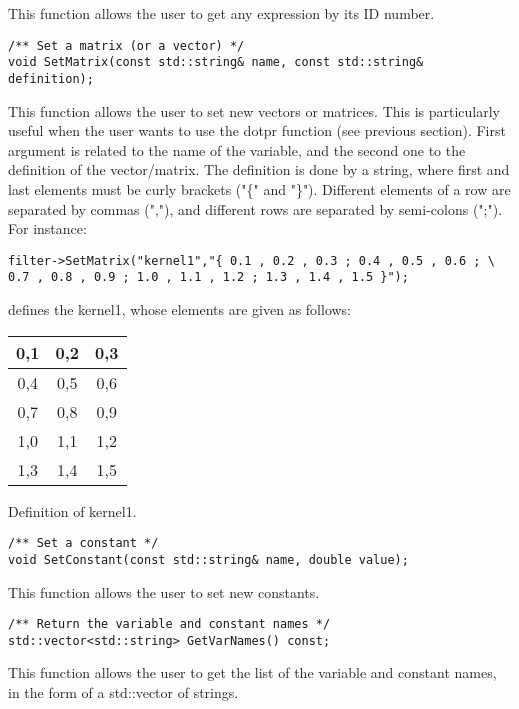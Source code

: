 This function allows the user to get any expression by its ID number.

\begin{verbatim}
/** Set a matrix (or a vector) */
void SetMatrix(const std::string& name, const std::string& definition);
\end{verbatim}

This function allows the user to set new vectors or matrices. This is 
particularly useful when the user wants to use the dotpr function 
(see previous section). First argument is related to the name of the 
variable, and the second one to the definition of the vector/matrix. 
The definition is done by a string, where first and last elements must 
be curly brackets ("\{" and "\}"). Different elements of a row are 
separated by commas (","), and different rows are separated by 
semi-colons (";"). For instance:

\begin{verbatim}
filter->SetMatrix("kernel1","{ 0.1 , 0.2 , 0.3 ; 0.4 , 0.5 , 0.6 ; \
0.7 , 0.8 , 0.9 ; 1.0 , 1.1 , 1.2 ; 1.3 , 1.4 , 1.5 }");
\end{verbatim}

defines the kernel1, whose elements are given as follows:

\begin{center} 
\begin{tabular}{|c|c|c|}
\hline
0,1	& 0,2	& 0,3 \\
\hline
0,4 &	0,5	& 0,6 \\
\hline
0,7 &	0,8	& 0,9 \\
\hline
1,0	& 1,1	& 1,2 \\
\hline
1,3	& 1,4	& 1,5 \\
\hline
\end{tabular}
\end{center}
\caption{Definition of kernel1.}
\label{correctness}

\begin{verbatim}
/** Set a constant */
void SetConstant(const std::string& name, double value);
\end{verbatim}

This function allows the user to set new constants.

\begin{verbatim}
/** Return the variable and constant names */
std::vector<std::string> GetVarNames() const;
\end{verbatim}

This function allows the user to get the list of the variable and constant names, in the form of a std::vector of strings.

